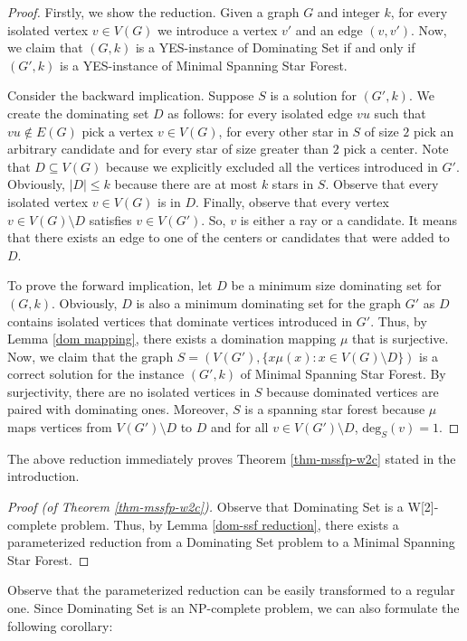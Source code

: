 \documentclass[en]{pracamgr}
\newcommand{\mssfp}{{\sc Minimal Spanning Star Forest}}
\newcommand{\domset}{dominating set}
\newcommand{\domsetp}{{\sc Dominating Set}}
\newcommand{\degree}[2]{\textrm{deg}_{#1}(#2)}
\begin{document}
\begin{proof}
	Firstly, we show the reduction. Given a graph $G$ and integer $k$, for every isolated vertex $v \in V(G)$ we introduce a vertex $v'$ and an edge $(v,v')$. Now, we claim that $(G,k)$ is a YES-instance of \domsetp{} if and only if $(G',k)$ is a YES-instance of \mssfp{}. 
	
	Consider the backward implication. Suppose $S$ is a solution for $(G',k)$. We create the \domset{} $D$ as follows: for every isolated edge $vu$ such that $vu \notin E(G)$ pick a vertex $v \in V(G)$, for every other star in $S$ of size $2$ pick an arbitrary candidate and for every star of size greater than $2$ pick a center. Note that $D \subseteq V(G)$ because we explicitly excluded all the vertices introduced in $G'$. Obviously, $|D| \leq k$ because there are at most $k$ stars in $S$. Observe that every isolated vertex $v \in V(G)$ is in $D$. Finally, observe that every vertex $v \in V(G) \setminus D$ satisfies $v \in V(G')$. So, $v$ is either a ray or a candidate. It means that there exists an edge to one of the centers or candidates that were added to $D$.
	
	To prove the forward implication, let $D$ be a minimum size dominating set for $(G,k)$. Obviously, $D$ is also a minimum dominating set for the graph $G'$ as $D$ contains isolated vertices that dominate vertices introduced in $G'$. Thus, by Lemma \ref{dom mapping}, there exists a domination mapping $\mu$ that is surjective. Now, we claim that the graph $S=(V(G'),\{x\mu(x): x \in V(G) \setminus D\})$ is a correct solution for the instance $(G',k)$ of \mssfp{}. By surjectivity, there are no isolated vertices in $S$ because dominated vertices are paired with dominating ones. Moreover, $S$ is a spanning star forest because $\mu$ maps vertices from $V(G') \setminus D$ to $D$ and for all $v \in V(G') \setminus D$, $\degree{S}{v}=1$.
	
\end{proof}

The above reduction immediately proves Theorem \ref{thm-mssfp-w2c} stated in the introduction.

\begin{proof}[Proof (of Theorem \ref{thm-mssfp-w2c})]
	Observe that \domsetp{} is a W[2]-complete problem. Thus, by Lemma \ref{dom-ssf reduction}, there exists a parameterized reduction from a \domsetp{} problem to a \mssfp{}.
\end{proof}

Observe that the parameterized reduction can be easily transformed to a regular one. Since \domsetp{} is an NP-complete problem, we can also formulate the following corollary:
\end{document}

